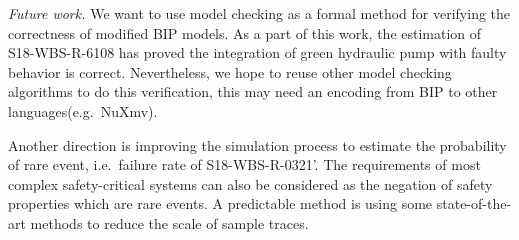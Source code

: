 \documentclass[runningheads]{llncs}
\begin{document}
\emph{Future work.}  We want to use model checking as a formal method for verifying the correctness of modified BIP models. As a part of this work, the estimation of S18-WBS-R-6108 has proved the integration of green hydraulic pump with faulty behavior is correct. Nevertheless, we hope to reuse other model checking algorithms to do this verification, this may need an encoding from BIP to other languages(e.g.\ NuXmv).

Another direction is improving the simulation process to estimate the probability of rare event, i.e.\ failure rate of S18-WBS-R-0321'. The requirements of most complex safety-critical systems can also be considered as the negation of safety properties which are rare events. A predictable method is using some state-of-the-art methods\cite{rarevent1}\cite{rarevent2} to reduce the scale of sample traces.
%
%
%
% 
% 
%



\end{document}

